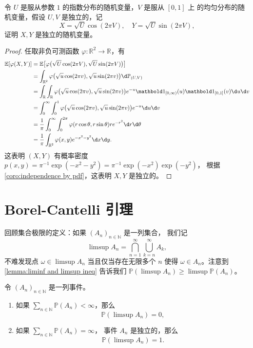 \documentclass[fontset=none]{Notes}
\newcommand{\indicator}[1]{\mathbold 1_{#1}}
\begin{document}
\begin{example}
  令 $U$ 是服从参数 $1$ 的指数分布的随机变量，$V$ 是服从 $[0,1]$ 上
  的均匀分布的随机变量，假设 $U,V$ 是独立的，记
  \[
    X=\sqrt{U}\cos(2\pi V),\quad Y=\sqrt{U}\sin(2\pi V),  
  \]
  证明 $X,Y$ 是独立的随机变量。
\end{example}
\begin{proof}
  任取非负可测函数 $\varphi:\mathbb{R}^2\to \mathbb{R}$，有
  \begin{align*}
    \mathbb{E}[\varphi(X,Y)]
    &=\mathbb{E}
    \bigl[\varphi\bigl(\sqrt{U}\cos(2\pi V),\sqrt{U}\sin(2\pi V)\bigr)\bigr]\\
    &=\int_{\mathbb{R}^2}\varphi\bigl(\sqrt{u}\cos(2\pi v),\sqrt{u}\sin(2\pi v)\bigr)
    \d \mathbb{P}_{(U,V)}\\
    &=\int_{\mathbb{R}}\int_{\mathbb{R}}\varphi\bigl(\sqrt{u}\cos(2\pi v),\sqrt{u}\sin(2\pi v)\bigr)
      e^{-u}\indicator{[0,\infty)}(u)\indicator{[0,1]}(v)\d u\d v\\
    &=\int_{0}^\infty\int_0^1\varphi\bigl(\sqrt{u}\cos(2\pi v),\sqrt{u}\sin(2\pi v)\bigr)
    e^{-u}\d u\d v \\
    &=\frac{1}{\pi}\int_0^\infty\int_0^{2\pi}
    \varphi(r\cos\theta,r\sin\theta)re^{-r^2}\d r\d\theta\\
    &=\frac{1}{\pi}\int_{\mathbb{R}^2}\varphi(x,y)e^{-x^2-y^2}\d x\d y.
  \end{align*}
  这表明 $(X,Y)$ 有概率密度 $p(x,y)=\pi^{-1}\exp(-x^2-y^2)=\pi^{-1}\exp(-x^2)\exp(-y^2)$，
  根据 \autoref{coro:independence by pdf}，这表明 $X,Y$
  是独立的。
\end{proof}

\section{Borel-Cantelli 引理}

回顾集合极限的定义：如果 $(A_n)_{n\in \mathbb{N}}$ 是一列集合，
我们记
\[
  \limsup A_n=\bigcap_{n=1}^\infty \bigcup_{k=n}^\infty A_k,  
\]
不难发现点 $\omega\in\limsup A_n$ 当且仅当存在无限多个
$n$ 使得 $\omega\in A_n$。注意到
\ref{lemma:liminf and limsup ineq} 告诉我们
$\mathbb{P}(\limsup A_n)\geq \limsup \mathbb{P}(A_n)$。

\begin{lemma}
  令 $(A_n)_{n\in \mathbb{N}}$ 是一列事件。
  \begin{enumerate}
    \item 如果 $\sum_{n\in \mathbb{N}}\mathbb{P}(A_n)<\infty$，那么
    \[
      \mathbb{P}(\limsup A_n)=0,  
    \]
    \item 如果 $\sum_{n\in \mathbb{N}}\mathbb{P}(A_n)=\infty$，
    事件 $A_n$ 是独立的，那么
    \[
      \mathbb{P}(\limsup A_n)=1.  
    \]
  \end{enumerate}
\end{lemma}
\end{document}
